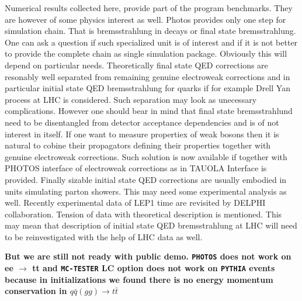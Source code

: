 \documentclass[]{Photos_interface_design}
\begin{document}
Numerical results collected here, provide part of the program benchmarks. 
They are however of  some physics interest as well.
 Photos provides only one step for simulation chain. That is 
bremsstrahlung in decays or final state bremsstrahlung. One can ask 
a question if such specialized unit is of interest and if it is not better 
to provide the complete chain as single simulation package. Obviously this will
depend on particular needs. Theoretically final state QED corrections are 
resonably well separated from remaining genuine electroweak corrections and 
in particular initial state QED bremsstrahlung for quarks if for example 
Drell Yan process at LHC is considered. Such separation may look as unecessary 
complications. However one should bear in mind that final state bremsstrahlund 
need to be disentangled from detector acceptance dependencies and is of not 
interest in itself. If one want to measure propertiex of weak bosons then it 
is natural to cobine their propagators defining their properties together with 
genuine electroweak corrections. Such solution is now available if together 
with PHOTOS interface of electroweak corrections as in TAUOLA Interface is 
provided. 
Finally sizable initial state QED corrections are usually embodied in  units 
simulating parton showers. This may need some experimental analysis as well. 
Recently experimental data of LEP1 time are revisited \cite{Abdallah:2010tk} 
by DELPHI collaboration. Tension of data with theoretical description is 
mentioned. This may mean that description of initial state QED bremsstrahlung 
at LHC will need to be reinvestigated with the help of LHC data as well.



{\bf But we are still not ready with public demo. {\tt PHOTOS} does not work on ee $\to $ tt
and {\tt MC-TESTER} LC option does not work on {\tt PYTHIA} events because in initializations 
we found there is no energy momentum conservation in $q \bar q (gg) \to t \bar t$}
\end{document}
